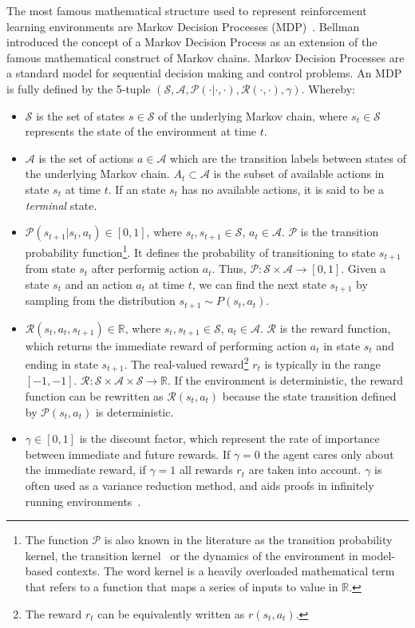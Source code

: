 \documentclass{../main.tex}{subfiles}
\begin{document}
The most famous mathematical structure used to represent reinforcement learning environments are Markov Decision Processes (MDP)~\citep{Bellman1957}. Bellman introduced the concept of a Markov Decision Process as an extension of the famous mathematical construct of Markov chains. Markov Decision Processes are a standard model for sequential decision making and control problems. An MDP is fully defined by the 5-tuple $(\mathcal{S}, \mathcal{A}, \mathcal{P(\cdot | \cdot, \cdot)}, \mathcal{R}(\cdot, \cdot), \gamma)$. Whereby:

\begin{itemize}
\item $\mathcal{S}$ is the set of states $s \in \mathcal{S}$ of the underlying Markov chain, where $s_t \in \mathcal{S}$ represents the state of the environment at time $t$.
\item $\mathcal{A}$ is the set of actions $a \in \mathcal{A}$ which are the transition labels between states of the underlying Markov chain. $A_t \subset \mathcal{A}$ is the subset of available actions in state $s_t$ at time $t$. If an state $s_t$ has no available actions, it is said to be a \textit{terminal} state.
\item $\mathcal{P}(s_{t+1} | s_t, a_t) \in [0, 1]$, where $s_t, s_{t+1} \in \mathcal{S}$, $a_t \in \mathcal{A}$. $\mathcal{P}$ is the transition probability function\footnote{The function $\mathcal{P}$ is also known in the literature as the transition probability kernel, the transition kernel~\citep{Tamar2017} or the dynamics of the environment in model-based contexts. The word kernel is a heavily overloaded mathematical term that refers to a function that maps a series of inputs to value in $\mathbb{R}$.}. It defines the probability of transitioning to state $s_{t+1}$ from state $s_t$ after performig action $a_t$. Thus, $\mathcal{P}: \mathcal{S} \times \mathcal{A} \to [0,1]$. Given a state $s_t$ and an action $a_t$ at time $t$, we can find the next state $s_{t+1}$ by sampling from the distribution $s_{t+1} \sim P(s_t, a_t)$.%
\item $\mathcal{R}(s_t, a_t, s_{t+1}) \in \mathbb{R}$, where $s_t, s_{t+1} \in \mathcal{S}$, $a_t \in \mathcal{A}$. $\mathcal{R}$ is the reward function, which returns the immediate reward of performing action $a_t$ in state $s_t$ and ending in state $s_{t+1}$. The real-valued reward\footnote{The reward $r_t$ can be equivalently written as $r(s_t, a_t)$.} $r_t$ is typically in the range $[-1,-1]$. $\mathcal{R}: \mathcal{S} \times \mathcal{A} \times \mathcal{S} \to \mathbb{R}$. If the environment is deterministic, the reward function can be rewritten as $\mathcal{R}(s_t, a_t)$ because the state transition defined by $\mathcal{P}(s_t, a_t)$ is deterministic.
\item $\gamma \in [0,1]$ is the discount factor, which represent the rate of importance between immediate and future rewards. If $\gamma = 0$ the agent cares only about the immediate reward, if $\gamma = 1$ all rewards $r_t$ are taken into account. $\gamma$ is often used as a variance reduction method, and aids proofs in infinitely running environments~\citep{Sutton1999}.
\end{itemize}
\end{document}

